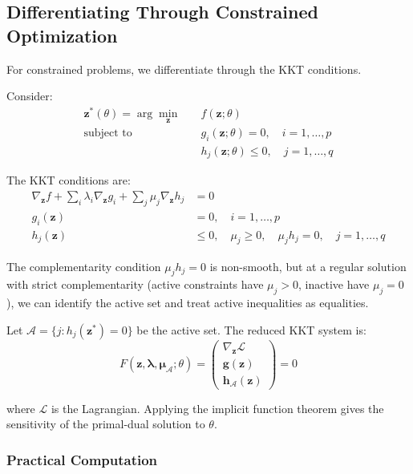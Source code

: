 \subsection{Differentiating Through Constrained Optimization}

For constrained problems, we differentiate through the KKT conditions.

Consider:
\begin{equation}
\begin{aligned}
\mathbf{z}^*(\theta) = \arg\min_{\mathbf{z}} \quad & f(\mathbf{z}; \theta) \\
\text{subject to} \quad & g_i(\mathbf{z}; \theta) = 0, \quad i = 1, \ldots, p \\
& h_j(\mathbf{z}; \theta) \leq 0, \quad j = 1, \ldots, q
\end{aligned}
\end{equation}

The KKT conditions are:
\begin{align}
\nabla_{\mathbf{z}} f + \sum_i \lambda_i \nabla_{\mathbf{z}} g_i + \sum_j \mu_j \nabla_{\mathbf{z}} h_j &= 0 \label{eq:kkt_stationarity} \\
g_i(\mathbf{z}) &= 0, \quad i = 1, \ldots, p \\
h_j(\mathbf{z}) &\leq 0, \quad \mu_j \geq 0, \quad \mu_j h_j = 0, \quad j = 1, \ldots, q
\end{align}

The complementarity condition $\mu_j h_j = 0$ is non-smooth, but at a regular solution with strict complementarity (active constraints have $\mu_j > 0$, inactive have $\mu_j = 0$), we can identify the active set and treat active inequalities as equalities.

Let $\mathcal{A} = \{j : h_j(\mathbf{z}^*) = 0\}$ be the active set. The reduced KKT system is:
\begin{equation}
F(\mathbf{z}, \boldsymbol{\lambda}, \boldsymbol{\mu}_{\mathcal{A}}; \theta) = \begin{pmatrix}
\nabla_{\mathbf{z}} \mathcal{L} \\
\mathbf{g}(\mathbf{z}) \\
\mathbf{h}_{\mathcal{A}}(\mathbf{z})
\end{pmatrix} = 0
\end{equation}

where $\mathcal{L}$ is the Lagrangian. Applying the implicit function theorem gives the sensitivity of the primal-dual solution to $\theta$.

\subsubsection{Practical Computation}

